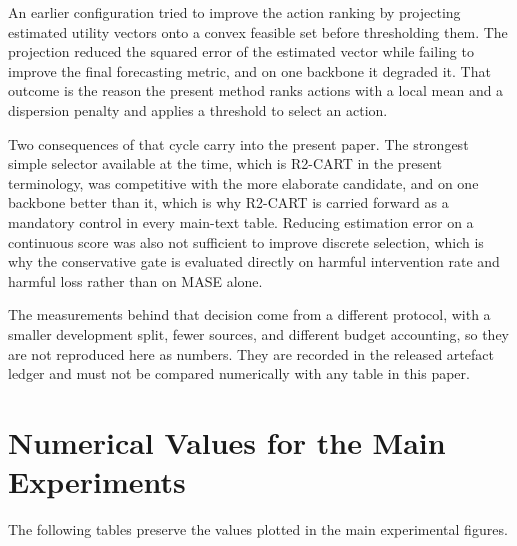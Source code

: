 \documentclass{article}
\begin{document}
An earlier configuration tried to improve the action ranking by projecting estimated utility
vectors onto a convex feasible set before thresholding them. The projection reduced the squared
error of the estimated vector while failing to improve the final forecasting metric, and on one
backbone it degraded it. That outcome is the reason the present method ranks actions with a
local mean and a dispersion penalty and applies a threshold to select an action.

Two consequences of that cycle carry into the present paper. The strongest simple selector
available at the time, which is R2-CART in the present terminology, was competitive with the
more elaborate candidate, and on one backbone better than it, which is why R2-CART is carried
forward as a mandatory control in every main-text table. Reducing estimation error on a
continuous score was also not sufficient to improve discrete selection, which is why the
conservative gate is evaluated directly on harmful intervention rate and harmful loss rather
than on MASE alone.

The measurements behind that decision come from a different protocol, with a smaller
development split, fewer sources, and different budget accounting, so they are not reproduced
here as numbers. They are recorded in the released artefact ledger and must not be compared
numerically with any table in this paper.

\clearpage
\section{Numerical Values for the Main Experiments}
\label{app:main-values}
The following tables preserve the values plotted in the main experimental figures.
\end{document}
